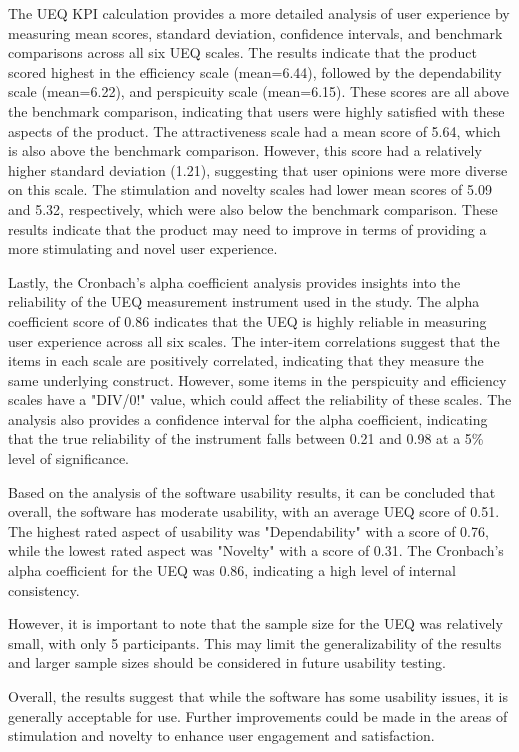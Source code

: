\documentclass[conference,onecolumn]{IEEEtran}
\begin{document}
    The UEQ KPI calculation provides a more detailed analysis of user experience by measuring mean scores, standard deviation, confidence intervals, and benchmark comparisons across all six UEQ scales. The results indicate that the product scored highest in the efficiency scale (mean=6.44), followed by the dependability scale (mean=6.22), and perspicuity scale (mean=6.15). These scores are all above the benchmark comparison, indicating that users were highly satisfied with these aspects of the product. The attractiveness scale had a mean score of 5.64, which is also above the benchmark comparison. However, this score had a relatively higher standard deviation (1.21), suggesting that user opinions were more diverse on this scale. The stimulation and novelty scales had lower mean scores of 5.09 and 5.32, respectively, which were also below the benchmark comparison. These results indicate that the product may need to improve in terms of providing a more stimulating and novel user experience.

    Lastly, the Cronbach's alpha coefficient analysis provides insights into the reliability of the UEQ measurement instrument used in the study. The alpha coefficient score of 0.86 indicates that the UEQ is highly reliable in measuring user experience across all six scales. The inter-item correlations suggest that the items in each scale are positively correlated, indicating that they measure the same underlying construct. However, some items in the perspicuity and efficiency scales have a "DIV/0!" value, which could affect the reliability of these scales. The analysis also provides a confidence interval for the alpha coefficient, indicating that the true reliability of the instrument falls between 0.21 and 0.98 at a 5\% level of significance.

    Based on the analysis of the software usability results, it can be concluded that overall, the software has moderate usability, with an average UEQ score of 0.51. The highest rated aspect of usability was "Dependability" with a score of 0.76, while the lowest rated aspect was "Novelty" with a score of 0.31. The Cronbach's alpha coefficient for the UEQ was 0.86, indicating a high level of internal consistency.

    However, it is important to note that the sample size for the UEQ was relatively small, with only 5 participants. This may limit the generalizability of the results and larger sample sizes should be considered in future usability testing.

    Overall, the results suggest that while the software has some usability issues, it is generally acceptable for use. Further improvements could be made in the areas of stimulation and novelty to enhance user engagement and satisfaction.
\end{document}
